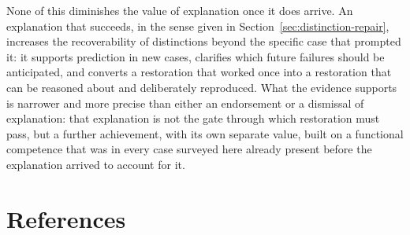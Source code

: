 \documentclass[11pt]{article}
\theoremstyle{plain}
\begin{document}
None of this diminishes the value of explanation once it does arrive. An explanation that succeeds, in the sense given in Section~\ref{sec:distinction-repair}, increases the recoverability of distinctions beyond the specific case that prompted it: it supports prediction in new cases, clarifies which future failures should be anticipated, and converts a restoration that worked once into a restoration that can be reasoned about and deliberately reproduced. What the evidence supports is narrower and more precise than either an endorsement or a dismissal of explanation: that explanation is not the gate through which restoration must pass, but a further achievement, with its own separate value, built on a functional competence that was in every case surveyed here already present before the explanation arrived to account for it.

\newpage
\section*{References}
\end{document}
